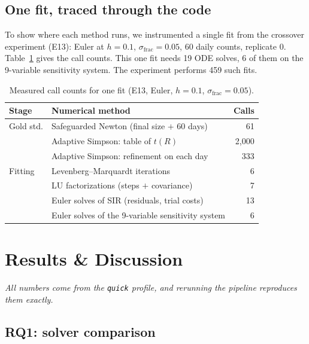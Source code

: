 \documentclass[sigconf]{acmart}
\begin{document}
\subsection{One fit, traced through the code}
To show where each method runs, we instrumented a single fit from the
crossover experiment (E13): Euler at $h=0.1$,
$\sigma_{\mathrm{frac}}=0.05$, 60 daily counts, replicate 0.
Table~\ref{tab:trace} gives the call counts. This one fit needs 19 ODE
solves, 6 of them on the 9-variable sensitivity system. The experiment
performs 459 such fits.

\begin{table}[t]
  \centering
  \footnotesize
  \caption{Measured call counts for one fit (E13, Euler, $h=0.1$,
    $\sigma_{\mathrm{frac}}=0.05$).}
  \label{tab:trace}
  \begin{tabularx}{\columnwidth}{@{}l X r@{}}
    \toprule
    Stage & Numerical method & Calls\\
    \midrule
    Gold std. & Safeguarded Newton (final size $+$ 60 days) & 61\\
     & Adaptive Simpson: table of $t(R)$ & 2{,}000\\
     & Adaptive Simpson: refinement on each day & 333\\
    Fitting & Levenberg--Marquardt iterations & 6\\
     & LU factorizations (steps $+$ covariance) & 7\\
     & Euler solves of SIR (residuals, trial costs) & 13\\
     & Euler solves of the 9-variable sensitivity system & 6\\
    \bottomrule
  \end{tabularx}
\end{table}

\section{Results \& Discussion}
\label{sec:results}
\emph{All numbers come from the \texttt{quick} profile, and rerunning the
pipeline reproduces them exactly.}

\subsection{RQ1: solver comparison}
\label{sec:res-rq1}
\end{document}

